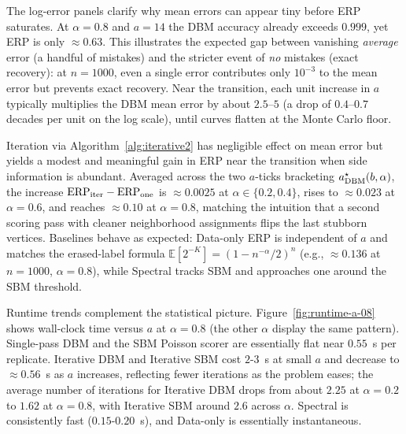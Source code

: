 \documentclass[11pt]{article}
\theoremstyle{plain}
\theoremstyle{definition}
\begin{document}
The log-error panels clarify why mean errors can appear tiny before ERP saturates. At $\alpha=0.8$ and $a=14$ the DBM accuracy already exceeds $0.999$, yet ERP is only $\approx 0.63$. This illustrates the expected gap between vanishing \emph{average} error (a handful of mistakes) and the stricter event of \emph{no} mistakes (exact recovery): at $n=1000$, even a single error contributes only $10^{-3}$ to the mean error but prevents exact recovery. Near the transition, each unit increase in $a$ typically multiplies the DBM mean error by about $2.5$--$5$ (a drop of $0.4$--$0.7$ decades per unit on the log scale), until curves flatten at the Monte Carlo floor.


Iteration via Algorithm~\ref{alg:iterative2} has negligible effect on mean error but yields a modest and meaningful gain in ERP near the transition when side information is abundant. Averaged across the two $a$-ticks bracketing $a^\star_{\rm DBM}(b,\alpha)$, the increase $\mathrm{ERP}_{\rm iter}-\mathrm{ERP}_{\rm one}$ is $\approx 0.0025$ at $\alpha\in\{0.2,0.4\}$, rises to $\approx 0.023$ at $\alpha=0.6$, and reaches $\approx 0.10$ at $\alpha=0.8$, matching the intuition that a second scoring pass with cleaner neighborhood assignments flips the last stubborn vertices. Baselines behave as expected: Data-only ERP is independent of $a$ and matches the erased-label formula $\mathbb{E}[2^{-K}]=(1-n^{-\alpha}/2)^n$ (e.g., $\approx 0.136$ at $n=1000$, $\alpha=0.8$), while Spectral tracks SBM and approaches one around the SBM threshold.

Runtime trends complement the statistical picture. Figure~\ref{fig:runtime-a-08} shows wall-clock time versus $a$ at $\alpha=0.8$ (the other $\alpha$ display the same pattern). Single-pass DBM and the SBM Poisson scorer are essentially flat near $0.55$\ s per replicate. Iterative DBM and Iterative SBM cost $2$-$3$\ s at small $a$ and decrease to $\approx 0.56$\ s as $a$ increases, reflecting fewer iterations as the problem eases; the average number of iterations for Iterative DBM drops from about $2.25$ at $\alpha=0.2$ to $1.62$ at $\alpha=0.8$, with Iterative SBM around $2.6$ across $\alpha$. Spectral is consistently fast ($0.15$-$0.20$\ s), and Data-only is essentially instantaneous.
\end{document}
